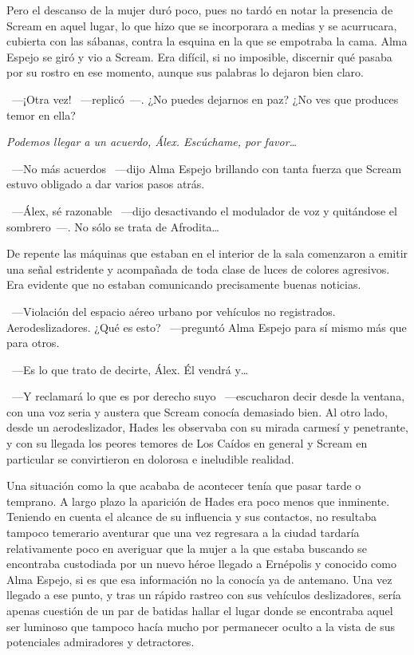 Pero el descanso de la mujer duró poco, pues no tardó en notar la presencia de Scream en aquel lugar, lo que hizo que se incorporara a medias y se acurrucara, cubierta con las sábanas, contra la esquina en la que se empotraba la cama. Alma Espejo se giró y vio a Scream. Era difícil, si no imposible, discernir qué pasaba por su rostro en ese momento, aunque sus palabras lo dejaron bien claro.

~---¡Otra vez! ~---replicó~---. ¿No puedes dejarnos en paz? ¿No ves que produces temor en ella?

\emph{Podemos llegar a un acuerdo, Álex. Escúchame, por favor\dots}

~---No más acuerdos ~---dijo Alma Espejo brillando con tanta fuerza que Scream estuvo obligado a dar varios pasos atrás.

~---Álex, sé razonable ~---dijo desactivando el modulador de voz y quitándose el sombrero~---. No sólo se trata de Afrodita\dots

De repente las máquinas que estaban en el interior de la sala comenzaron a emitir una señal estridente y acompañada de toda clase de luces de colores agresivos. Era evidente que no estaban comunicando precisamente buenas noticias.

~---Violación del espacio aéreo urbano por vehículos no registrados. Aerodeslizadores. ¿Qué es esto? ~---preguntó Alma Espejo para sí mismo más que para otros.

~---Es lo que trato de decirte, Álex. Él vendrá y\dots

~---Y reclamará lo que es por derecho suyo ~---escucharon decir desde la ventana, con una voz seria y austera que Scream conocía demasiado bien. Al otro lado, desde un aerodeslizador, Hades les observaba con su mirada carmesí y penetrante, y con su llegada los peores temores de Los Caídos en general y Scream en particular se convirtieron en dolorosa e ineludible realidad.

\parbreak
Una situación como la que acababa de acontecer tenía que pasar tarde o temprano. A largo plazo la aparición de Hades era poco menos que inminente. Teniendo en cuenta el alcance de su influencia y sus contactos, no resultaba tampoco temerario aventurar que una vez regresara a la ciudad tardaría relativamente poco en averiguar que la mujer a la que estaba buscando se encontraba custodiada por un nuevo héroe llegado a Ernépolis y conocido como Alma Espejo, si es que esa información no la conocía ya de antemano. Una vez llegado a ese punto, y tras un rápido rastreo con sus vehículos deslizadores, sería apenas cuestión de un par de batidas hallar el lugar donde se encontraba aquel ser luminoso que tampoco hacía mucho por permanecer oculto a la vista de sus potenciales admiradores y detractores.

